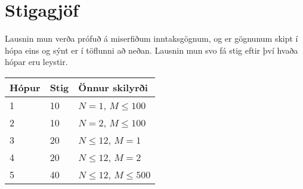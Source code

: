\section*{Stigagjöf}
Lausnin mun verða prófuð á miserfiðum inntaksgögnum, og er gögnunum skipt í
hópa eins og sýnt er í töflunni að neðan. Lausnin mun svo fá stig eftir því
hvaða hópar eru leystir.

\begin{tabular}{|l|l|l|}
\hline
Hópur & Stig & Önnur skilyrði \\ \hline
1 & 10 & $N=1$, $M \leq 100$ \\ \hline
2 & 10 & $N=2$, $M \leq 100$ \\ \hline
3 & 20 & $N \leq 12$, $M=1$ \\ \hline
4 & 20 & $N \leq 12$, $M=2$ \\ \hline
5 & 40 & $N \leq 12$, $M \leq 500$ \\ \hline
\end{tabular}
